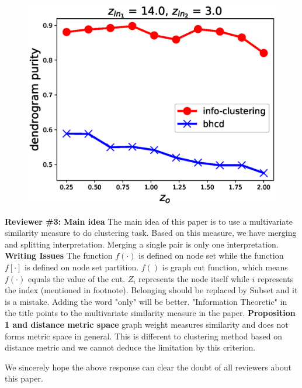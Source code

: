 \documentclass{article}
\begin{document}
\begin{subfigure}{0.33\textwidth}
	\includegraphics[width=\textwidth]{pic/z_o-dp.eps}
\end{subfigure}

\textbf{Reviewer \#3:}
\textbf{Main idea} The main idea of this paper is to use a multivariate similarity measure to do clustering task. Based on this measure, we have merging and splitting interpretation.  Merging a single pair is only one interpretation.
\textbf{Writing Issues} The function $f(\cdot)$ is defined on node set while the function $f[\cdot]$ is defined on node set partition. $f()$ is graph cut function, which means $f(\cdot)$ equals the value of the cut. $Z_i$ represents the node itself while $i$ represents the index (mentioned in footnote). Belonging should be replaced by Subset and it is a mistake. Adding the word "only" will be better.
"Information Theoretic" in the title points to the multivariate similarity measure in the paper.
\textbf{Proposition 1 and distance metric space} graph weight measures similarity and does not forms metric space in general. This is different to clustering method based on distance metric and we cannot deduce the limitation by this criterion.

We sincerely hope the above response can clear the doubt of all reviewers about this paper.
\end{document}
